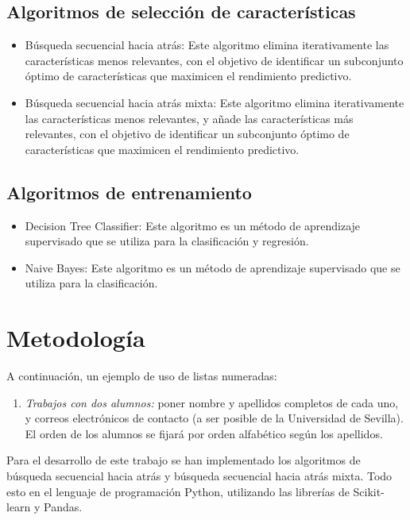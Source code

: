 \documentclass[conference,a4paper]{IEEEtran}
\begin{document}
    \subsection*{Algoritmos de selección de características}
    \begin{itemize}
      \item Búsqueda secuencial hacia atrás: Este algoritmo elimina iterativamente las características menos relevantes, con el objetivo 
      de identificar un subconjunto óptimo de características que maximicen el rendimiento predictivo.
      \item Búsqueda secuencial hacia atrás mixta: Este algoritmo elimina iterativamente las características menos relevantes, y añade las
      características más relevantes, con el objetivo de identificar un subconjunto óptimo de características que maximicen el rendimiento predictivo.
    \end{itemize}

    \subsection*{Algoritmos de entrenamiento}
    \begin{itemize}
      \item Decision Tree Classifier: Este algoritmo es un método de aprendizaje supervisado que se utiliza para la clasificación y regresión.
      \item Naive Bayes: Este algoritmo es un método de aprendizaje supervisado que se utiliza para la clasificación. 
    \end{itemize}


\section{Metodología}

A continuación, un ejemplo de uso de listas numeradas:
\begin{enumerate}
  \item\label{item:dos-alumnos} \textit{Trabajos con dos alumnos:} poner nombre y
  apellidos completos de cada uno, y correos electrónicos de contacto (a ser
  posible de la Universidad de Sevilla). El orden de los alumnos se fijará por
  orden alfabético según los apellidos.
\end{enumerate}

Para el desarrollo de este trabajo se han implementado los algoritmos de búsqueda secuencial 
hacia atrás y búsqueda secuencial hacia atrás mixta.
Todo esto en el lenguaje de programación Python, utilizando las librerías de Scikit-learn y Pandas.
\end{document}
